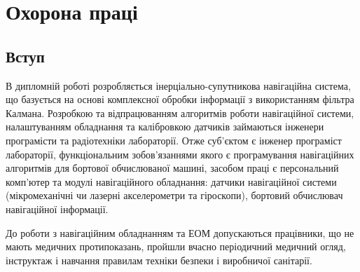 % 




\section{Охорона праці}
\subsection{Вступ}

В дипломній роботі розробляється інерціально-супутникова навігаційна система, що базується на основі комплексної обробки інформації з використанням фільтра Калмана. Розробкою та відпрацюванням алгоритмів роботи навігаційної системи, налаштуванням обладнання та калібровкою датчиків займаються інженери програмісти та радіотехніки лабораторії. Отже суб’єктом є інженер програміст лабораторії, функціональним зобов'язаннями якого є програмування навігаційних алгоритмів для бортової обчислюваної машині, засобом праці є персональний комп'ютер та модулі навігаційного обладнання: датчики навігаційної системи (мікромеханічні чи лазерні акселерометри та гіроскопи), бортовий обчислювач навігаційної інформації.

До роботи з навігаційним обладнанням та ЕОМ допускаються працівники, що не мають медичних протипоказань, пройшли вчасно періодичний медичний огляд, інструктаж і навчання  правилам техніки безпеки і виробничої санітарії.

